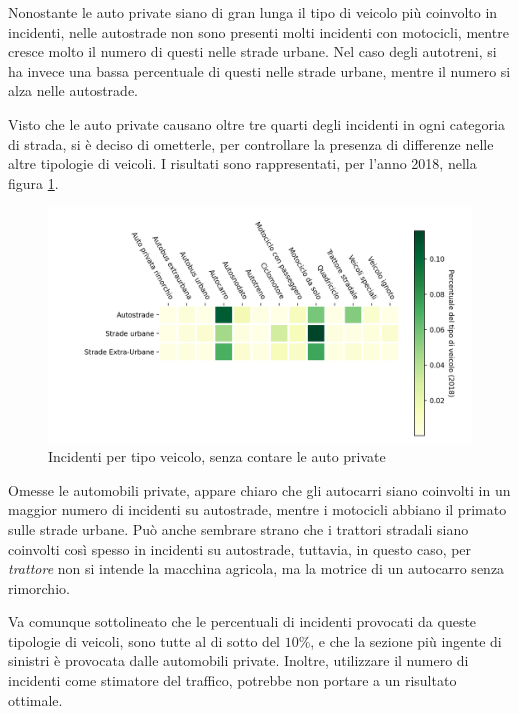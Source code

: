 \documentclass[a4paper,12pt]{report}
\newcommand{\quotestyle}[1]{\textit{#1}}
\begin{document}
Nonostante le auto private siano di gran lunga il tipo di veicolo 
più coinvolto in incidenti, nelle autostrade non sono presenti molti incidenti con motocicli, 
mentre cresce molto il numero di questi nelle strade urbane.
Nel caso degli autotreni, si ha invece una bassa percentuale di questi nelle strade 
urbane, mentre il numero si alza nelle autostrade.

Visto che le auto private causano oltre tre quarti degli incidenti in ogni categoria di strada,  
si è deciso di ometterle, per controllare la presenza di differenze nelle altre tipologie 
di veicoli.
I risultati sono rappresentati, per l'anno 2018, nella figura \ref{fig:differenza-strade-no-auto}.

\begin{figure}
    \includegraphics[width=\linewidth]{../src/incidenti/incidenti_senza_coords/tipo_veicoli/differenza_senza_auto.png}
    \caption{Incidenti per tipo veicolo, senza contare le auto private}
    \label{fig:differenza-strade-no-auto}
\end{figure}

Omesse le automobili private, appare chiaro che gli autocarri siano coinvolti in un maggior 
numero di incidenti su autostrade, mentre i motocicli abbiano il primato sulle strade urbane.
Può anche sembrare strano che i trattori stradali siano coinvolti così spesso in incidenti 
su autostrade, tuttavia, in questo caso, per \quotestyle{trattore} non si intende la macchina 
agricola, ma la motrice di un autocarro senza rimorchio.

Va comunque sottolineato che le percentuali di incidenti provocati da queste tipologie di 
veicoli, sono tutte al di sotto del $10$\%, e che la sezione più ingente di sinistri è 
provocata dalle automobili private. 
Inoltre, utilizzare il numero di incidenti come stimatore del traffico, potrebbe 
non portare a un risultato ottimale.
\end{document}
